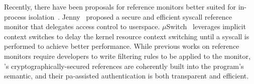 




Recently, there have been proposals for reference monitors better suited for in-process isolation~\cite{donky,jenny,cerberus,muswitch}.
Jenny~\cite{jenny} proposed a secure and efficient syscall reference monitor that delegates access control to userspace.
$\mu$Switch~\cite{muswitch} leverages implicit context switches to delay the kernel resource context switching until a syscall is performed to achieve better performance.
While previous works on reference monitors require developers to write filtering rules to be applied to the monitor, \thename's cryptographically-secured \fd references are coherently built into the program's semantic, and their \gls{pa}-assisted authentication is both transparent and efficient.



